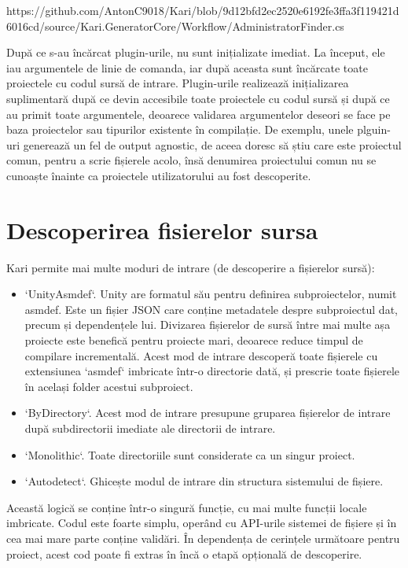 \documentclass{report}
\begin{document}
https://github.com/AntonC9018/Kari/blob/9d12bfd2ec2520e6192fe3ffa3f119421d6016cd/source/Kari.GeneratorCore/Workflow/AdministratorFinder.cs

După ce s-au încărcat plugin-urile, nu sunt inițializate imediat.
La început, ele iau argumentele de linie de comanda, iar după aceasta sunt încărcate toate proiectele cu codul sursă de intrare.
Plugin-urile realizează inițializarea suplimentară după ce devin accesibile toate proiectele cu codul sursă și după ce au primit toate argumentele, deoarece validarea argumentelor deseori se face pe baza proiectelor sau tipurilor existente în compilație.
De exemplu, unele plguin-uri generează un fel de output agnostic, de aceea doresc să știu care este proiectul comun, pentru a scrie fișierele acolo, însă denumirea proiectului comun nu se cunoaște înainte ca proiectele utilizatorului au fost descoperite.

\section{Descoperirea fisierelor sursa}

Kari permite mai multe moduri de intrare (de descoperire a fișierelor sursă):

\begin{itemize}
  \item `UnityAsmdef`.
    Unity are formatul său pentru definirea subproiectelor, numit asmdef.
    Este un fișier JSON care conține metadatele despre subproiectul dat, precum și dependențele lui.
    Divizarea fișierelor de sursă între mai multe așa proiecte este benefică pentru proiecte mari, deoarece reduce timpul de compilare incrementală.
    Acest mod de intrare descoperă toate fișierele cu extensiunea `asmdef` imbricate într-o directorie dată, și prescrie toate fișierele în același folder acestui subproiect.

  \item `ByDirectory`. Acest mod de intrare presupune gruparea fișierelor de intrare după subdirectorii imediate ale directorii de intrare.

  \item `Monolithic`. Toate directoriile sunt considerate ca un singur proiect.

  \item `Autodetect`. Ghicește modul de intrare din structura sistemului de fișiere.
\end{itemize}

Această logică se conține într-o singură funcție, cu mai multe funcții locale imbricate.
Codul este foarte simplu, operând cu API-urile sistemei de fișiere și în cea mai mare parte conține validări.
În dependența de cerințele următoare pentru proiect, acest cod poate fi extras în încă o etapă opțională de descoperire.
\end{document}
